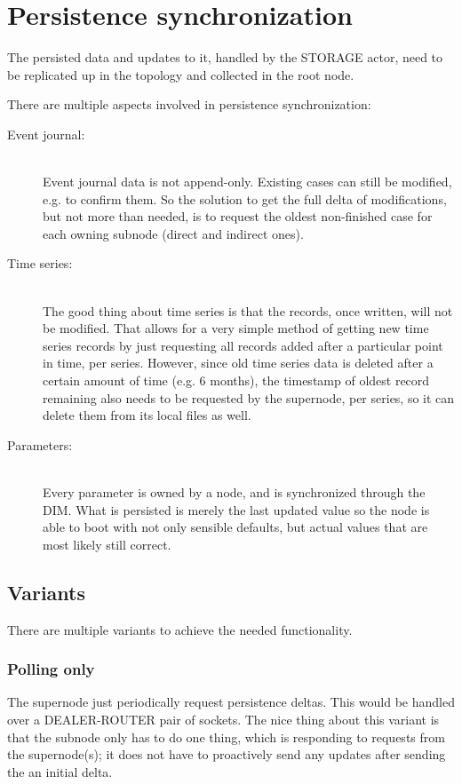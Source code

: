 \section{Persistence synchronization}\label{sec:approach:psync}
The persisted data and updates to it, handled by the STORAGE actor, need to
be replicated up in the topology and collected in the root node.

There are multiple aspects involved in persistence synchronization:

\begin{description}
	\item [Event journal:]\hfill\\

		Event journal data is not
		append-only. Existing cases can still be modified, e.g. to
		confirm them. So the solution to get the full delta of
		modifications, but not more than needed, is to request the
		oldest non-finished case for each owning subnode (direct and
		indirect ones).

	\item [Time series:]\hfill\\
		The good thing about time series is
		that the records, once written, will not be modified. That allows
		for a very simple method of getting new time series records by
		just requesting all records added after a particular point in
		time, per series. However, since old time series data is
		deleted after a certain amount of time (e.g. 6 months), the
		timestamp of oldest record remaining also needs to be requested
		by the supernode, per series, so it can delete them from its
		local files as well.

	\item [Parameters:]\hfill\\
		Every parameter is owned by a node, and is
		synchronized through the DIM.  What is persisted is merely the
		last updated value so the node is able to boot with not only
		sensible defaults, but actual values that are most likely still
		correct.
\end{description}


\subsection{Variants}
There are multiple variants to achieve the needed functionality.

\subsubsection{Polling only}
The supernode just periodically request persistence
deltas. This would be handled over a DEALER-ROUTER pair of sockets. The nice
thing about this variant is that the subnode only has to do one thing, which is
responding to requests from the supernode(s); it does not have to proactively
send any updates after sending the an initial delta.

